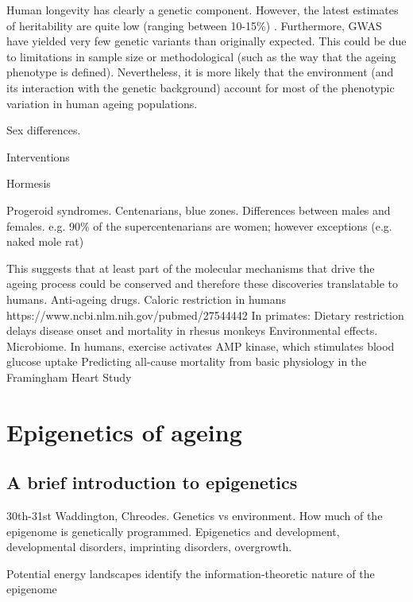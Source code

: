 \bigskip

Human longevity has clearly a genetic component. However, the latest estimates of heritability are quite low (ranging between 10-15\%) \cite{Ruby2018a,Kaplanis2018}. Furthermore, \acrshort{GWAS} have yielded very few genetic variants than originally expected. This could be due to limitations in sample size or methodological (such as the way that the ageing phenotype is defined). Nevertheless, it is more likely that the environment (and its interaction with the genetic background) account for most of the phenotypic variation in human ageing populations.

Sex differences. 



\bigskip

Interventions


Hormesis

Progeroid syndromes.
Centenarians, blue zones.
Differences between males and females. e.g. 90\% of the supercentenarians are women; however exceptions (e.g. naked mole rat) 



This suggests that at least part of the molecular mechanisms that drive the ageing process could be conserved and therefore these discoveries translatable to humans. Anti-ageing drugs.
Caloric restriction in humans
https://www.ncbi.nlm.nih.gov/pubmed/27544442
In primates: Dietary restriction delays disease onset and mortality in rhesus monkeys
Environmental effects. Microbiome. In humans, exercise activates AMP kinase, which stimulates blood glucose uptake
Predicting all-cause mortality from basic physiology in the Framingham Heart Study


\section{Epigenetics of ageing}

\subsection{A brief introduction to epigenetics}

30th-31st
Waddington, Chreodes.
Genetics vs environment. How much of the epigenome is genetically programmed.
Epigenetics and development, developmental disorders, imprinting disorders, overgrowth.

Potential energy landscapes identify the information-theoretic nature of the epigenome

